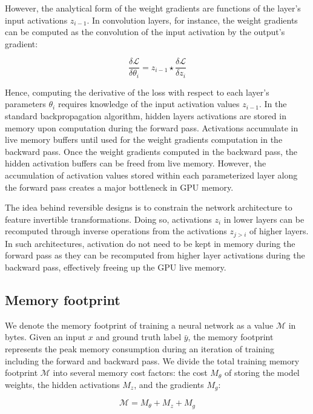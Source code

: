 \documentclass[twocolumn]{bmcart}
\begin{document}
However, the analytical form of the weight gradients are functions of the layer's input activations $z_{i-1}$. 
In convolution layers, for instance, the weight gradients can be computed as the convolution of the input activation by the output's gradient:

 \begin{equation}
\frac{\delta \mathcal{L}}{\delta \theta_i} = z_{i-1} \star \frac{\delta \mathcal{L}}{\delta z_i} 
 \end{equation}

Hence, computing the derivative of the loss with respect to each layer's parameters $\theta_i$ requires knowledge of the input activation values $z_{i-1}$.  
In the standard backpropagation algorithm, hidden layers activations are stored in memory upon computation during the forward pass. 
Activations accumulate in live memory buffers until used for the weight gradients computation in the backward pass. 
Once the weight gradients computed in the backward pass, the hidden activation buffers can be freed from live memory. 
However, the accumulation of activation values stored within each parameterized layer along the forward pass creates a major bottleneck in GPU memory.

The idea behind reversible designs is to constrain the network architecture to feature invertible transformations.
Doing so, activations $z_i$ in lower layers can be recomputed through inverse operations from the activations $z_{j>i}$ of higher layers.
In such architectures, activation do not need to be kept in memory during the forward pass as they can be recomputed from higher layer activations during the backward pass, effectively freeing up the GPU live memory.

\subsection{Memory footprint}

We denote the memory footprint of training a neural network as a value $\mathcal{M}$ in bytes. 
Given an input $x$ and ground truth label $\bar{y}$, the memory footprint represents the peak memory consumption during an iteration of training including the forward and backward pass.
We divide the total training memory footprint $\mathcal{M}$ into several memory cost factors: the cost $M_{\theta}$ of storing the model weights, the hidden activations  $M_{z}$, and the gradients $M_{g}$:

\begin{equation}
\mathcal{M} = M_{\theta} + M_{z} + M_{g}
\end{equation}
\end{document}
